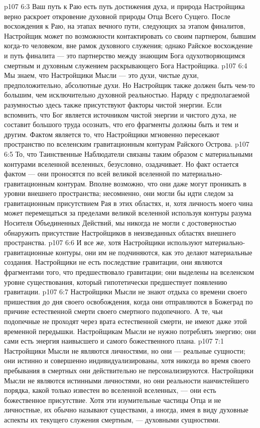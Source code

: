 \vs p107 6:3 Ваш путь к Раю есть путь достижения духа, и природа Настройщика верно раскроет откровение духовной природы Отца Всего Сущего. После восхождения к Раю, на этапах вечного пути, следующих за этапом финалитов, Настройщик может по возможности контактировать со своим партнером, бывшим когда\hyp{}то человеком, вне рамок духовного служения; однако Райское восхождение и путь финалита --- это партнерство между знающим Бога одухотворяющимся смертным и духовным служением раскрывающего Бога Настройщика.
\vs p107 6:4 \pc Мы знаем, что Настройщики Мысли --- это духи, чистые духи, предположительно, абсолютные духи. Но Настройщик также должен быть чем\hyp{}то большим, чем исключительно духовной реальностью. Наряду с предполагаемой разумностью здесь также присутствуют факторы чистой энергии. Если вспомнить, что Бог является источником чистой энергии и чистого духа, не составит большого труда осознать, что его фрагменты должны быть и тем и другим. Фактом является то, что Настройщики мгновенно пересекают пространство по вселенским гравитационным контурам Райского Острова.
\vs p107 6:5 То, что Таинственные Наблюдатели связаны таким образом с материальными контурами вселенной вселенных, безусловно, озадачивает. Но факт остается фактом --- они проносятся по всей великой вселенной по материально\hyp{}гравитационным контурам. Вполне возможно, что они даже могут проникать в уровни внешнего пространства; несомненно, они могли бы идти следом за гравитационным присутствием Рая в этих областях, и, хотя личность моего чина может перемещаться за пределами великой вселенной используя контуры разума Носителя Объединенных Действий, мы никогда не могли с достоверностью обнаружить присутствие Настройщиков в неизведанных областях внешнего пространства.
\vs p107 6:6 И все же, хотя Настройщики используют материально\hyp{}гравитационные контуры, они им не подчиняются, как это делают материальные создания. Настройщики не есть последствие гравитации, они являются фрагментами того, что предшествовало гравитации; они выделены на вселенском уровне существования, который гипотетически предшествует появлению гравитации.
\vs p107 6:7 Настройщики Мысли не знают отдыха со времени своего пришествия до дня своего освобождения, когда они отправляются в Божеград по причине естественной смерти своего смертного подопечного. А те, чьи подопечные не проходят через врата естественной смерти, не имеют даже этой временной передышки. Настройщикам Мысли не нужно потреблять энергию; они сами есть энергия наивысшего и самого божественного плана.
\vs p107 7:1 Настройщики Мысли не являются личностями, но они --- реальные сущности; они истинно и совершенно индивидуализированы, хотя никогда во время своего пребывания в смертных они действительно не персонализируются. Настройщики Мысли не являются истинными личностями, но они  реальности наичистейшего порядка, какой только известен во вселенной вселенных, --- они есть божественное присутствие. Хотя эти изумительные частицы Отца и не личностные, их обычно называют существами, а иногда, имея в виду духовные аспекты их текущего служения смертным, --- духовными сущностями.
